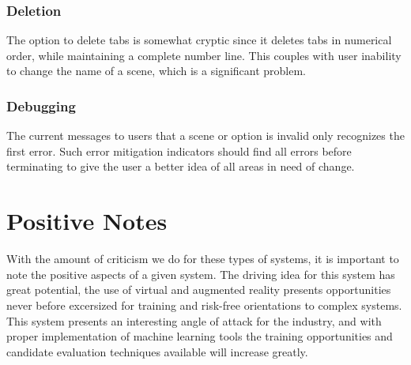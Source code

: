\documentclass[sigart, anonymous]{acmart} %
\begin{document}
\subsubsection{Deletion}
The option to delete tabs is somewhat cryptic since it deletes tabs in numerical order, while maintaining a complete number line. This couples with user inability to change the name of a scene, which is a significant problem.

\subsubsection{Debugging}
The current messages to users that a scene or option is invalid only recognizes the first error. Such error mitigation indicators should find all errors before terminating to give the user a better idea of all areas in need of change.

\section{Positive Notes}
With the amount of criticism we do for these types of systems, it is important to note the positive aspects of a given system. The driving idea for this system has great potential, the use of virtual and augmented reality presents opportunities never before excersized for training and risk-free orientations to complex systems. This system presents an interesting angle of attack for the industry, and with proper implementation of machine learning tools the training opportunities and candidate evaluation techniques available will increase greatly.
\end{document}
